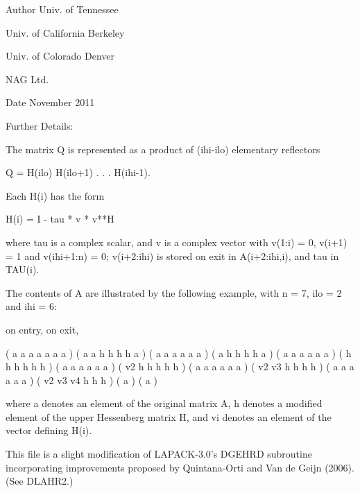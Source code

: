 \begin{DoxyAuthor}{Author}
Univ. of Tennessee 

Univ. of California Berkeley 

Univ. of Colorado Denver 

N\+A\+G Ltd. 
\end{DoxyAuthor}
\begin{DoxyDate}{Date}
November 2011 
\end{DoxyDate}
\begin{DoxyParagraph}{Further Details\+: }
\begin{DoxyVerb}  The matrix Q is represented as a product of (ihi-ilo) elementary
  reflectors

     Q = H(ilo) H(ilo+1) . . . H(ihi-1).

  Each H(i) has the form

     H(i) = I - tau * v * v**H

  where tau is a complex scalar, and v is a complex vector with
  v(1:i) = 0, v(i+1) = 1 and v(ihi+1:n) = 0; v(i+2:ihi) is stored on
  exit in A(i+2:ihi,i), and tau in TAU(i).

  The contents of A are illustrated by the following example, with
  n = 7, ilo = 2 and ihi = 6:

  on entry,                        on exit,

  ( a   a   a   a   a   a   a )    (  a   a   h   h   h   h   a )
  (     a   a   a   a   a   a )    (      a   h   h   h   h   a )
  (     a   a   a   a   a   a )    (      h   h   h   h   h   h )
  (     a   a   a   a   a   a )    (      v2  h   h   h   h   h )
  (     a   a   a   a   a   a )    (      v2  v3  h   h   h   h )
  (     a   a   a   a   a   a )    (      v2  v3  v4  h   h   h )
  (                         a )    (                          a )

  where a denotes an element of the original matrix A, h denotes a
  modified element of the upper Hessenberg matrix H, and vi denotes an
  element of the vector defining H(i).

  This file is a slight modification of LAPACK-3.0's DGEHRD
  subroutine incorporating improvements proposed by Quintana-Orti and
  Van de Geijn (2006). (See DLAHR2.)\end{DoxyVerb}
 
\end{DoxyParagraph}
\hypertarget{group__complexGEcomputational_gaf5aa309786b736467fe6b2353695883f}{}
